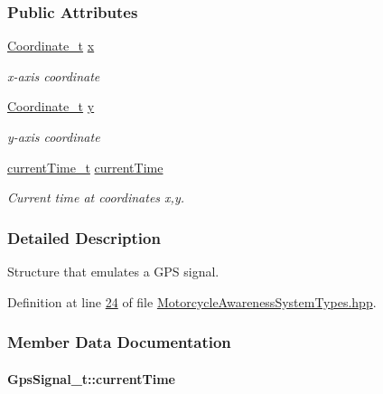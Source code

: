 \subsubsection*{Public Attributes}
\begin{DoxyCompactItemize}
\item 
\hyperlink{MotorcycleAwarenessSystemTypes_8hpp_ae989615510617e9b0ad39dcd343c78fb}{Coordinate\-\_\-t} \hyperlink{structGpsSignal__t_a6f7bd3c500b55923ab335ada4b6b26eb}{x}
\begin{DoxyCompactList}\small\item\em x-\/axis coordinate \end{DoxyCompactList}\item 
\hyperlink{MotorcycleAwarenessSystemTypes_8hpp_ae989615510617e9b0ad39dcd343c78fb}{Coordinate\-\_\-t} \hyperlink{structGpsSignal__t_ab9e083be189fc842ed7aa4fdc978e94e}{y}
\begin{DoxyCompactList}\small\item\em y-\/axis coordinate \end{DoxyCompactList}\item 
\hyperlink{MotorcycleAwarenessSystemTypes_8hpp_a75ae168a2dad22557428f696df806a76}{current\-Time\-\_\-t} \hyperlink{structGpsSignal__t_abc96245129f39c6e51e8bfe955f2047e}{current\-Time}
\begin{DoxyCompactList}\small\item\em Current time at coordinates x,y. \end{DoxyCompactList}\end{DoxyCompactItemize}


\subsubsection{Detailed Description}
Structure that emulates a G\-P\-S signal. 

Definition at line \hyperlink{MotorcycleAwarenessSystemTypes_8hpp_source_l00024}{24} of file \hyperlink{MotorcycleAwarenessSystemTypes_8hpp_source}{Motorcycle\-Awareness\-System\-Types.\-hpp}.



\subsubsection{Member Data Documentation}
\hypertarget{structGpsSignal__t_abc96245129f39c6e51e8bfe955f2047e}{
\paragraph[{current\-Time}]{ Gps\-Signal\-\_\-t\-::current\-Time}}\label{structGpsSignal__t_abc96245129f39c6e51e8bfe955f2047e}


